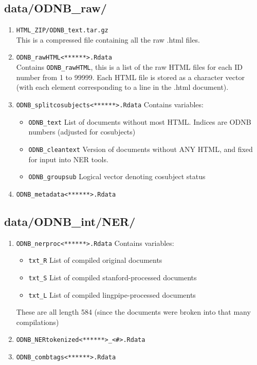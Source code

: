 \documentclass[11pt]{article}
\newcommand{\filename}[1]{\texttt{#1}}
\begin{document}
\subsection{data/ODNB\_raw/}
\begin{enumerate}
\item \filename{HTML\_ZIP/ODNB\_text.tar.gz} \\
This is a compressed file containing all the raw .html files. \\

\item \filename{ODNB\_rawHTML<******>.Rdata} \\
Contains \texttt{ODNB\_rawHTML}, this is a list of the raw HTML files for each ID number from 1 to 99999. Each HTML file is stored as a character vector (with each element corresponding to a line in the .html document).  

\item \filename{ODNB\_splitcosubjects<******>.Rdata}
Contains variables: 
\begin{itemize}
\item \texttt{ODNB\_text} List of documents without most HTML. Indices are ODNB numbers (adjusted for cosubjects)
\item \texttt{ODNB\_cleantext} Version of documents without ANY HTML, and fixed for input into NER tools. 
\item \texttt{ODNB\_groupsub} Logical vector denoting cosubject status
\end{itemize}

\item \filename{ODNB\_metadata<******>.Rdata}

\end{enumerate}

\subsection{data/ODNB\_int/NER/}
\begin{enumerate}
\item \filename{ODNB\_nerproc<******>.Rdata}
Contains variables: 
\begin{itemize}
\item \texttt{txt\_R} List of compiled original documents
\item \texttt{txt\_S} List of compiled stanford-processed documents
\item \texttt{txt\_L} List of compiled lingpipe-processed documents
\end{itemize}
These are all length 584 (since the documents were broken into that many compilations)

\item \filename{ODNB\_NERtokenized<******>\_<\#>.Rdata}

\item \filename{ODNB\_combtags<******>.Rdata}
\end{enumerate}
\end{document}
